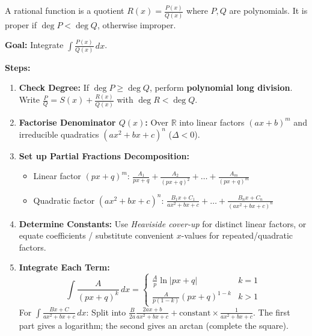 \documentclass[11pt]{article}
\newcommand{\cle}[1]{{\popxbold\color{popdark}#1}}
\begin{document}
\begin{definition}
A \cle{rational function} is a quotient $R(x)=\frac{P(x)}{Q(x)}$ where $P,Q$ are polynomials. It is \cle{proper} if $\deg P < \deg Q$, otherwise \cle{improper}.
\end{definition}

\begin{methode}
\textbf{Goal:} Integrate $\int \frac{P(x)}{Q(x)}\,dx$.
\par\noindent\textbf{Steps:}
\begin{enumerate}
    \item \textbf{Check Degree:} If $\deg P \ge \deg Q$, perform \textbf{polynomial long division}. Write $\frac{P}{Q} = S(x) + \frac{R(x)}{Q(x)}$ with $\deg R < \deg Q$.
    \item \textbf{Factorise Denominator $Q(x)$:} Over $\mathbb{R}$ into linear factors $(ax+b)^m$ and irreducible quadratics $(ax^2+bx+c)^n$ ($\Delta < 0$).
    \item \textbf{Set up Partial Fractions Decomposition:}
    \begin{itemize}
        \item Linear factor $(px+q)^m$: $\frac{A_1}{px+q} + \frac{A_2}{(px+q)^2} + \dots + \frac{A_m}{(px+q)^m}$
        \item Quadratic factor $(ax^2+bx+c)^n$: $\frac{B_1x+C_1}{ax^2+bx+c} + \dots + \frac{B_nx+C_n}{(ax^2+bx+c)^n}$
    \end{itemize}
    \item \textbf{Determine Constants:} Use \emph{Heaviside cover-up} for distinct linear factors, or equate coefficients / substitute convenient $x$-values for repeated/quadratic factors.
    \item \textbf{Integrate Each Term:}
    \[
    \int \frac{A}{(px+q)^k}\,dx = \begin{cases} \frac{A}{p}\ln|px+q| & k=1 \\ \frac{A}{p(1-k)}(px+q)^{1-k} & k>1 \end{cases}
    \]
    For $\int \frac{Bx+C}{ax^2+bx+c}\,dx$: Split into $\frac{B}{2a}\frac{2ax+b}{ax^2+bx+c} + \text{constant} \times \frac{1}{ax^2+bx+c}$. The first part gives a logarithm; the second gives an arctan (complete the square).
\end{enumerate}
\end{methode}
\end{document}
